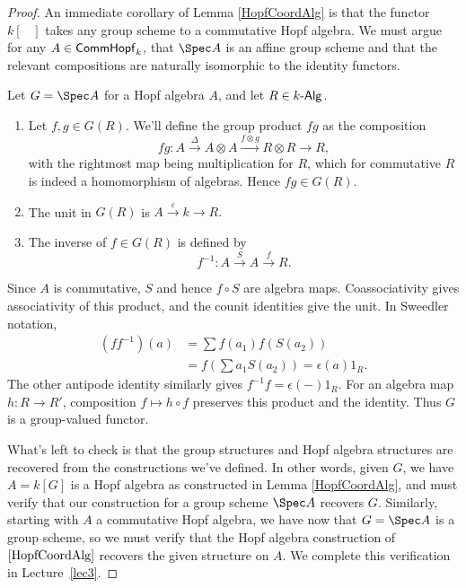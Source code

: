 \begin{proof}
    An immediate corollary of Lemma \ref{HopfCoordAlg} is that the functor $k[\phantom{X}]$ takes any group scheme to a commutative Hopf algebra. We must argue for any $A \in {\sf CommHopf}_k$, that $\Spec A$ is an affine group scheme and that the relevant compositions are naturally isomorphic to the identity functors. 

    Let $G = \Spec A$ for a Hopf algebra $A$, and let $R \in k\text{-}{\sf Alg}$.
    \begin{enumerate}[1)]
    \item Let $f, g \in G(R).$ We'll define the group product $fg$ as the composition
    \[fg : A \xrightarrow{\Delta} A \otimes A \xrightarrow{f \otimes g} R \otimes R  \to R,\]
    with the rightmost map being multiplication for $R$, which for commutative $R$ is indeed a homomorphism of algebras. Hence $fg \in G(R)$.  
    \item The unit in $G(R)$ is $A \xrightarrow{ \varepsilon} k \to R.$
    \item The inverse of $f \in G(R)$ is defined by
    \[f^{-1} : A \xrightarrow{S}A \xrightarrow{f} R.\]
    \end{enumerate}
    Since $A$ is commutative, $S$ and hence $f\circ S$ are algebra maps.
    Coassociativity gives associativity of this product, and the counit
    identities give the unit. In Sweedler notation,
    \begin{align*}
    (ff^{-1})(a)
      &=\sum f(a_1)f(S(a_2))\\
      &=f\!\left(\sum a_1S(a_2)\right)
       =\epsilon(a)1_R.
    \end{align*}
    The other antipode identity similarly gives $f^{-1}f=\epsilon(-)1_R$.
    For an algebra map $h:R\to R'$, composition $f\mapsto h\circ f$
    preserves this product and the identity. Thus $G$ is a group-valued functor.

    What's left to check is that the group structures and Hopf algebra structures are recovered from the constructions we've defined. In other words, given $G$, we have $A = k[G]$ is a Hopf algebra as constructed in Lemma \ref{HopfCoordAlg}, and must verify that our construction for a group scheme $\Spec A$ recovers $G$. Similarly, starting with $A$ a commutative Hopf algebra, we have now that $G = \Spec A$ is a group scheme, so we must verify that the Hopf algebra construction of $\ref{HopfCoordAlg}$ recovers the given structure on $A$. We complete this verification in Lecture~\ref{lec3}.  
\end{proof}